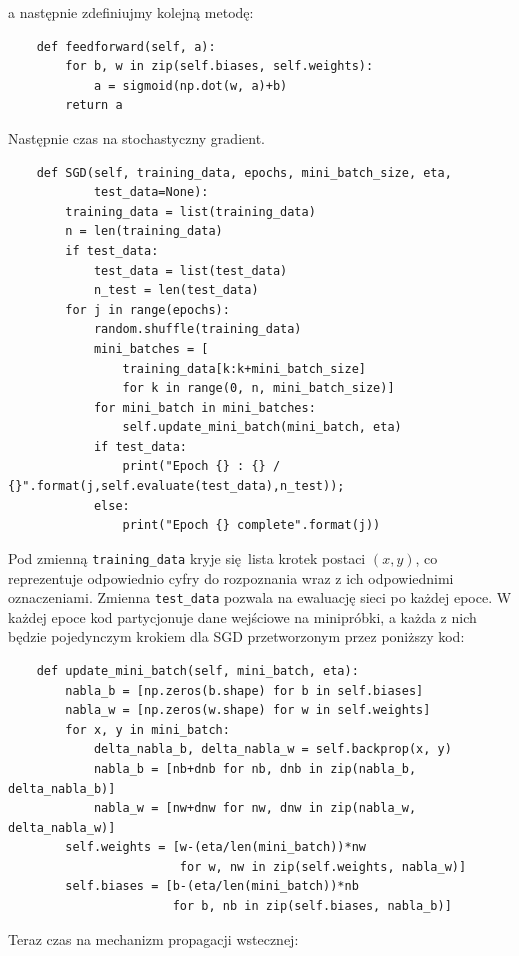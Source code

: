 \documentclass[10pt, oneside]{article}
\theoremstyle{remark}
\begin{document}
a następnie zdefiniujmy kolejną metodę:
\begin{verbatim}
    def feedforward(self, a):
        for b, w in zip(self.biases, self.weights):
            a = sigmoid(np.dot(w, a)+b)
        return a
\end{verbatim}
Następnie czas na stochastyczny gradient.
\begin{verbatim}
    def SGD(self, training_data, epochs, mini_batch_size, eta,
            test_data=None):
        training_data = list(training_data)
        n = len(training_data)
        if test_data:
            test_data = list(test_data)
            n_test = len(test_data)
        for j in range(epochs):
            random.shuffle(training_data)
            mini_batches = [
                training_data[k:k+mini_batch_size]
                for k in range(0, n, mini_batch_size)]
            for mini_batch in mini_batches:
                self.update_mini_batch(mini_batch, eta)
            if test_data:
                print("Epoch {} : {} / {}".format(j,self.evaluate(test_data),n_test));
            else:
                print("Epoch {} complete".format(j))
\end{verbatim}
Pod zmienną \texttt{training_data} kryje się lista krotek postaci $(x, y)$, co reprezentuje odpowiednio cyfry do rozpoznania wraz z ich odpowiednimi oznaczeniami.
Zmienna \texttt{test_data} pozwala na ewaluację sieci po każdej epoce.
W każdej epoce kod partycjonuje dane wejściowe na minipróbki, a każda z nich będzie pojedynczym krokiem dla SGD przetworzonym przez poniższy kod:
\begin{verbatim}
    def update_mini_batch(self, mini_batch, eta):
        nabla_b = [np.zeros(b.shape) for b in self.biases]
        nabla_w = [np.zeros(w.shape) for w in self.weights]
        for x, y in mini_batch:
            delta_nabla_b, delta_nabla_w = self.backprop(x, y)
            nabla_b = [nb+dnb for nb, dnb in zip(nabla_b, delta_nabla_b)]
            nabla_w = [nw+dnw for nw, dnw in zip(nabla_w, delta_nabla_w)]
        self.weights = [w-(eta/len(mini_batch))*nw
                        for w, nw in zip(self.weights, nabla_w)]
        self.biases = [b-(eta/len(mini_batch))*nb
                       for b, nb in zip(self.biases, nabla_b)]
\end{verbatim}
Teraz czas na mechanizm propagacji wstecznej:
\end{document}
